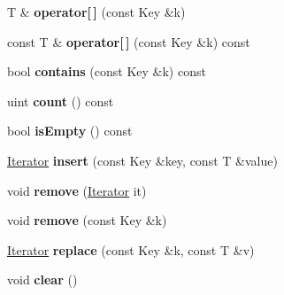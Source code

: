 \begin{DoxyCompactItemize}
\item 
\hypertarget{class_q_map_ab7d1b1c4a5217b4b49f66f446523ec44}{T \& {\bfseries operator\mbox{[}$\,$\mbox{]}} (const Key \&k)}\label{class_q_map_ab7d1b1c4a5217b4b49f66f446523ec44}

\item 
\hypertarget{class_q_map_a5fdbe772de4febdf84a7334ef3dd9f72}{const T \& {\bfseries operator\mbox{[}$\,$\mbox{]}} (const Key \&k) const }\label{class_q_map_a5fdbe772de4febdf84a7334ef3dd9f72}

\item 
\hypertarget{class_q_map_aae15538a39b09f28247398949f058d63}{bool {\bfseries contains} (const Key \&k) const }\label{class_q_map_aae15538a39b09f28247398949f058d63}

\item 
\hypertarget{class_q_map_a774149fc271ebaba2aabcd183a836e8f}{uint {\bfseries count} () const }\label{class_q_map_a774149fc271ebaba2aabcd183a836e8f}

\item 
\hypertarget{class_q_map_a479432127ee77145cc19d6a2d1590821}{bool {\bfseries is\-Empty} () const }\label{class_q_map_a479432127ee77145cc19d6a2d1590821}

\item 
\hypertarget{class_q_map_a26b1c31c405f0f1c62be1cfbc649e964}{\hyperlink{class_q_map_a8037b7e85b3b6dc9ae44eccdf67eccb6}{Iterator} {\bfseries insert} (const Key \&key, const T \&value)}\label{class_q_map_a26b1c31c405f0f1c62be1cfbc649e964}

\item 
\hypertarget{class_q_map_a1429b885adbfe9075b0e36a034b5b54c}{void {\bfseries remove} (\hyperlink{class_q_map_a8037b7e85b3b6dc9ae44eccdf67eccb6}{Iterator} it)}\label{class_q_map_a1429b885adbfe9075b0e36a034b5b54c}

\item 
\hypertarget{class_q_map_a7099f92f29e9c8a0cbce8d0bfd4f440a}{void {\bfseries remove} (const Key \&k)}\label{class_q_map_a7099f92f29e9c8a0cbce8d0bfd4f440a}

\item 
\hypertarget{class_q_map_afabbdae22ffaf89516bc5e666f1a9a35}{\hyperlink{class_q_map_a8037b7e85b3b6dc9ae44eccdf67eccb6}{Iterator} {\bfseries replace} (const Key \&k, const T \&v)}\label{class_q_map_afabbdae22ffaf89516bc5e666f1a9a35}

\item 
\hypertarget{class_q_map_ac8bb3912a3ce86b15842e79d0b421204}{void {\bfseries clear} ()}\label{class_q_map_ac8bb3912a3ce86b15842e79d0b421204}

\end{DoxyCompactItemize}
